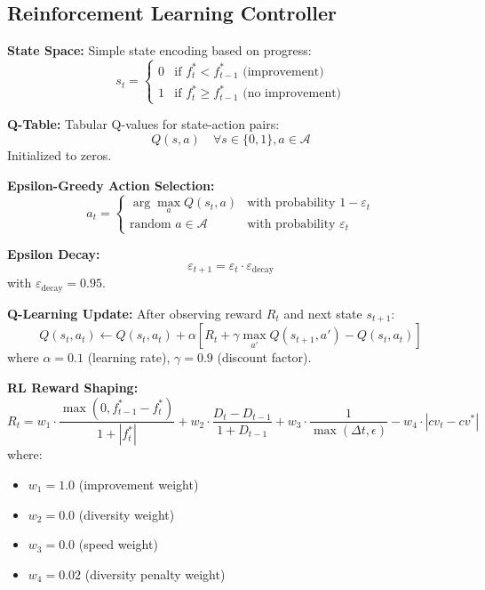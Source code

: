 \documentclass[12pt,a4paper]{article}
\begin{document}
\subsection{Reinforcement Learning Controller}
\textbf{State Space:}
Simple state encoding based on progress:
\begin{equation}
s_t = \begin{cases}
0 & \text{if } f_t^* < f_{t-1}^* \text{ (improvement)} \\
1 & \text{if } f_t^* \geq f_{t-1}^* \text{ (no improvement)}
\end{cases} \label{eq:rl_state}
\end{equation}

\textbf{Q-Table:}
Tabular Q-values for state-action pairs:
\begin{equation}
Q(s,a) \quad \forall s \in \{0,1\}, a \in \mathcal{A} \label{eq:q_table}
\end{equation}
Initialized to zeros.

\textbf{Epsilon-Greedy Action Selection:}
\begin{equation}
a_t = \begin{cases}
\arg\max_{a} Q(s_t, a) & \text{with probability } 1 - \varepsilon_t \\
\text{random } a \in \mathcal{A} & \text{with probability } \varepsilon_t
\end{cases} \label{eq:epsilon_greedy}
\end{equation}

\textbf{Epsilon Decay:}
\begin{equation}
\varepsilon_{t+1} = \varepsilon_t \cdot \varepsilon_{\text{decay}} \label{eq:epsilon_decay}
\end{equation}
with $\varepsilon_{\text{decay}} = 0.95$.

\textbf{Q-Learning Update:}
After observing reward $R_t$ and next state $s_{t+1}$:
\begin{equation}
Q(s_t, a_t) \leftarrow Q(s_t, a_t) + \alpha \left[ R_t + \gamma \max_{a'} Q(s_{t+1}, a') - Q(s_t, a_t) \right] \label{eq:q_learning_update}
\end{equation}
where $\alpha = 0.1$ (learning rate), $\gamma = 0.9$ (discount factor).

\textbf{RL Reward Shaping:}
\begin{equation}
R_t = w_1 \cdot \frac{\max(0, f_{t-1}^* - f_t^*)}{1 + |f_t^*|} + w_2 \cdot \frac{D_t - D_{t-1}}{1 + D_{t-1}} + w_3 \cdot \frac{1}{\max(\Delta t, \epsilon)} - w_4 \cdot |cv_t - cv^*| \label{eq:rl_reward_shaping}
\end{equation}
where:
\begin{itemize}
\item $w_1 = 1.0$ (improvement weight)
\item $w_2 = 0.0$ (diversity weight)
\item $w_3 = 0.0$ (speed weight)
\item $w_4 = 0.02$ (diversity penalty weight)
\end{itemize}
\end{document}
